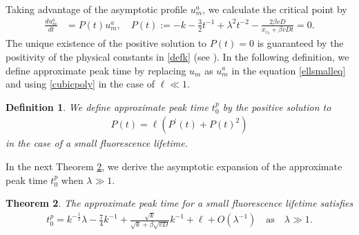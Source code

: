 \documentclass[10pt]{article}
\newtheorem{theorem}{Theorem}[section]
\newtheorem{definition}[theorem]{Definition}
\numberwithin{equation}{section}
\numberwithin{figure}{section}
\begin{document}
Taking advantage of the asymptotic profile $u_m^a$, we calculate the  critical point by
\begin{equation}\label{cubicpoly}
\begin{split}
\frac{d u_m^a}{ dt } &= P(t) u_m^a, \quad
P(t) := - k  - \frac{3}{2} t^{-1} + \lambda^2 t^{-2} 
- \frac{2\beta v D}{x_{c_3} + \beta v D t} = 0.
\end{split}
\end{equation}
The unique existence of the positive solution to $P(t)=0$ 
is guaranteed by the positivity of the physical constants in \eqref{defk} (see \cite[Theorem 3.1]{Chen2023}). In the following definition, we define approximate peak time by replacing $u_m$ as $u_m^a$ in the equation \eqref{ellsmalleq} and using \eqref{cubicpoly} in the case of  $\ell \ll 1$.
\begin{definition}\label{def_lzero}
We define approximate peak time $t^{p}_0$ by the positive solution to 
\begin{equation}\label{ellsmalldef}
\begin{split}
P(t) = \ell \left( P^{'}(t) + P(t)^2 \right)
\end{split}
\end{equation}
in the case of a small fluorescence lifetime.
\end{definition}
In the next Theorem \ref{thm_lzero}, we derive the asymptotic expansion of the approximate peak time $t^{p}_0$ when $\lambda \gg 1$.
\begin{theorem}\label{thm_lzero}
The approximate peak time for a small fluorescence lifetime satisfies
\begin{equation}\label{asympofpeak1}
\begin{split}
t^{p}_0 =  k^{-\frac{1}{2}}\lambda - \frac{7}{4}k^{-1} + \frac{\sqrt{k}}{\sqrt{k}+\beta\sqrt{vD}}k^{-1} + \ell + O\left(\lambda^{-1}\right) \quad \mbox{as} \quad \lambda \gg 1. 
\end{split}
\end{equation}
\end{theorem}
\end{document}
